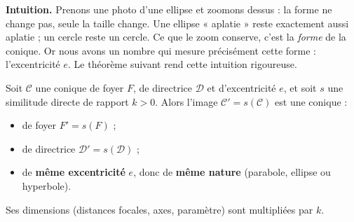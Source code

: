 \documentclass[11pt]{article}
\newcommand{\cle}[1]{{\popxbold\color{popdark}#1}}
\begin{document}
\textbf{Intuition.} Prenons une photo d'une ellipse et zoomons dessus : la forme ne change pas, seule la taille change. Une ellipse « aplatie » reste exactement aussi aplatie ; un cercle reste un cercle. Ce que le zoom conserve, c'est la \emph{forme} de la conique. Or nous avons un nombre qui mesure précisément cette forme : l'\cle{excentricité} $e$. Le théorème suivant rend cette intuition rigoureuse.

\begin{propriete}
Soit $\mathcal{C}$ une conique de foyer $F$, de directrice $\mathcal{D}$ et d'excentricité $e$, et soit $s$ une similitude directe de rapport $k>0$. Alors l'image $\mathcal{C}' = s(\mathcal{C})$ est une conique :
\begin{itemize}
\item de foyer $F' = s(F)$ ;
\item de directrice $\mathcal{D}' = s(\mathcal{D})$ ;
\item de \textbf{même excentricité} $e$, donc de \textbf{même nature} (parabole, ellipse ou hyperbole).
\end{itemize}
Ses dimensions (distances focales, axes, paramètre) sont multipliées par $k$.
\end{propriete}
\end{document}
